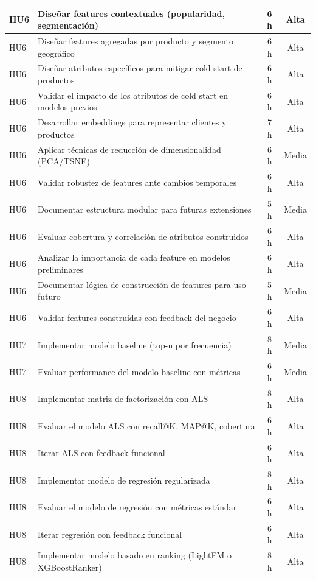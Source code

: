 \documentclass[
11pt, %
]{charter}
\begin{document}
\begin{longtable}{|p{2cm}|p{10cm}|c|c|}
HU6 & Diseñar features contextuales (popularidad, segmentación) & 6 h & Alta \\ \hline
HU6 & Diseñar features agregadas por producto y segmento geográfico & 6 h & Alta \\ \hline
HU6 & Diseñar atributos específicos para mitigar cold start de productos & 6 h & Alta \\ \hline
HU6 & Validar el impacto de los atributos de cold start en modelos previos & 6 h & Alta \\ \hline
HU6 & Desarrollar embeddings para representar clientes y productos & 7 h & Alta \\ \hline
HU6 & Aplicar técnicas de reducción de dimensionalidad (PCA/TSNE) & 6 h & Media \\ \hline
HU6 & Validar robustez de features ante cambios temporales & 6 h & Alta \\ \hline
HU6 & Documentar estructura modular para futuras extensiones & 5 h & Media \\ \hline
HU6 & Evaluar cobertura y correlación de atributos construidos & 6 h & Alta \\ \hline
HU6 & Analizar la importancia de cada feature en modelos preliminares & 6 h & Alta \\ \hline
HU6 & Documentar lógica de construcción de features para uso futuro & 5 h & Media \\ \hline
HU6 & Validar features construidas con feedback del negocio & 6 h & Alta \\ \hline
HU7 & Implementar modelo baseline (top-n por frecuencia) & 8 h & Media \\ \hline
HU7 & Evaluar performance del modelo baseline con métricas & 6 h & Media \\ \hline
HU8 & Implementar matriz de factorización con ALS & 8 h & Alta \\ \hline
HU8 & Evaluar el modelo ALS con recall@K, MAP@K, cobertura & 6 h & Alta \\ \hline
HU8 & Iterar ALS con feedback funcional & 6 h & Alta \\ \hline
HU8 & Implementar modelo de regresión regularizada & 8 h & Alta \\ \hline
HU8 & Evaluar el modelo de regresión con métricas estándar & 6 h & Alta \\ \hline
HU8 & Iterar regresión con feedback funcional & 6 h & Alta \\ \hline
HU8 & Implementar modelo basado en ranking (LightFM o XGBoostRanker) & 8 h & Alta \\ \hline

\end{longtable}
\end{document}
